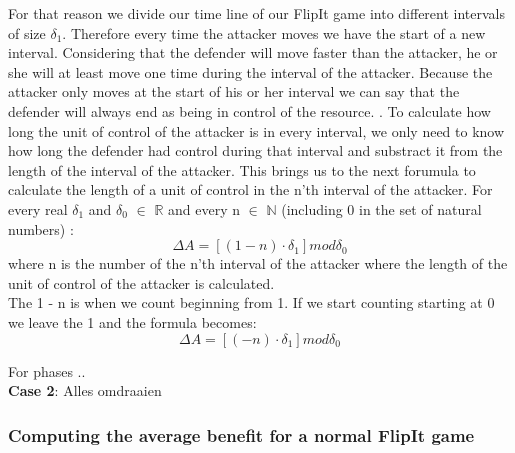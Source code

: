 For that reason we divide our time line of our FlipIt game into different intervals of size $\delta_{1}$. Therefore every time the attacker moves we have the start of a new interval. Considering that the defender will move faster than the attacker, he or she will at least move one time during the interval of the attacker. Because the attacker only moves at the start of his or her interval we can say that the defender will always end as being in control of the resource. . To calculate how long the unit of control of the attacker is in every interval, we only need to know how long the defender had control during that interval and substract it from the length of the interval of the attacker. 
This brings us to the next forumula to calculate the length of a unit of control in the n'th interval of the attacker. 
For every real $\delta_{1}$ and $\delta_{0}$ $\in$ \(\mathbb{R}\) and every n $\in$ \(\mathbb{N}\) (including 0 in the set of natural numbers) :
\begin{equation}\label{first}
\Delta A = [( 1- n  ) \cdot \delta_{1}] mod \delta_{0}
\end{equation}
where n is the number of the n'th interval of the attacker where the length of the unit of control of the attacker is calculated.\\

The 1 - n is when we count beginning from 1. If we start counting starting at 0 we leave the 1 and the formula becomes:
\begin{equation}\label{first}
\Delta A = [( - n  ) \cdot \delta_{1}] mod \delta_{0}
\end{equation}


For phases .. \\

\textbf{Case 2}:
Alles omdraaien 
\subsubsection{Computing the average benefit for a normal FlipIt game}

